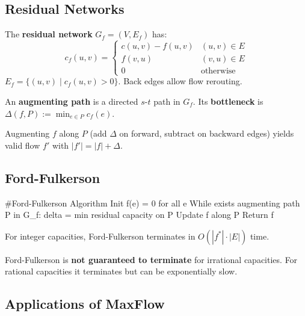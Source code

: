\subsection{Residual Networks}

\begin{definition}
	The \textbf{residual network} $G_f = (V, E_f)$ has:
	$$c_f(u,v) = \begin{cases} c(u,v) - f(u,v) & (u,v) \in E \\ f(v,u) & (v,u) \in E \\ 0 & \text{otherwise} \end{cases}$$
	$E_f = \{(u,v) \mid c_f(u,v) > 0\}$. Back edges allow flow rerouting.
\end{definition}

\begin{definition}
	An \textbf{augmenting path} is a directed $s$-$t$ path in $G_f$. Its \textbf{bottleneck} is $\Delta(f,P) := \min_{e \in P} c_f(e)$.
\end{definition}

\begin{lemma}
	Augmenting $f$ along $P$ (add $\Delta$ on forward, subtract on backward edges) yields valid flow $f'$ with $|f'| = |f| + \Delta$.
\end{lemma}

\subsection{Ford-Fulkerson}

\begin{algorithm}
	#Ford-Fulkerson Algorithm
	Init f(e) = 0 for all e
	While exists augmenting path P in G_f:
	delta = min residual capacity on P
	Update f along P
	Return f
\end{algorithm}

\begin{theorem}
	For integer capacities, Ford-Fulkerson terminates in $O(|f^*| \cdot |E|)$ time.
\end{theorem}

\begin{important}
	Ford-Fulkerson is \textbf{not guaranteed to terminate} for irrational capacities. For rational capacities it terminates but can be exponentially slow.
\end{important}

\subsection{Applications of MaxFlow}

